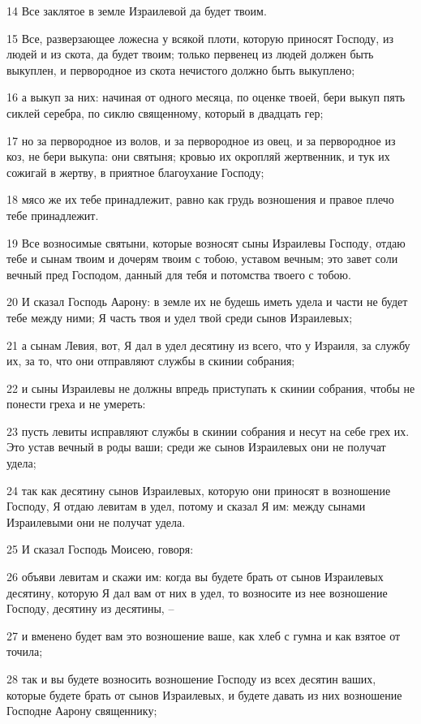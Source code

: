 \par 14 Все заклятое в земле Израилевой да будет твоим.
\par 15 Все, разверзающее ложесна у всякой плоти, которую приносят Господу, из людей и из скота, да будет твоим; только первенец из людей должен быть выкуплен, и первородное из скота нечистого должно быть выкуплено;
\par 16 а выкуп за них: начиная от одного месяца, по оценке твоей, бери выкуп пять сиклей серебра, по сиклю священному, который в двадцать гер;
\par 17 но за первородное из волов, и за первородное из овец, и за первородное из коз, не бери выкупа: они святыня; кровью их окропляй жертвенник, и тук их сожигай в жертву, в приятное благоухание Господу;
\par 18 мясо же их тебе принадлежит, равно как грудь возношения и правое плечо тебе принадлежит.
\par 19 Все возносимые святыни, которые возносят сыны Израилевы Господу, отдаю тебе и сынам твоим и дочерям твоим с тобою, уставом вечным; это завет соли вечный пред Господом, данный для тебя и потомства твоего с тобою.
\par 20 И сказал Господь Аарону: в земле их не будешь иметь удела и части не будет тебе между ними; Я часть твоя и удел твой среди сынов Израилевых;
\par 21 а сынам Левия, вот, Я дал в удел десятину из всего, что у Израиля, за службу их, за то, что они отправляют службы в скинии собрания;
\par 22 и сыны Израилевы не должны впредь приступать к скинии собрания, чтобы не понести греха и не умереть:
\par 23 пусть левиты исправляют службы в скинии собрания и несут на себе грех их. Это устав вечный в роды ваши; среди же сынов Израилевых они не получат удела;
\par 24 так как десятину сынов Израилевых, которую они приносят в возношение Господу, Я отдаю левитам в удел, потому и сказал Я им: между сынами Израилевыми они не получат удела.
\par 25 И сказал Господь Моисею, говоря:
\par 26 объяви левитам и скажи им: когда вы будете брать от сынов Израилевых десятину, которую Я дал вам от них в удел, то возносите из нее возношение Господу, десятину из десятины, --
\par 27 и вменено будет вам это возношение ваше, как хлеб с гумна и как взятое от точила;
\par 28 так и вы будете возносить возношение Господу из всех десятин ваших, которые будете брать от сынов Израилевых, и будете давать из них возношение Господне Аарону священнику;
